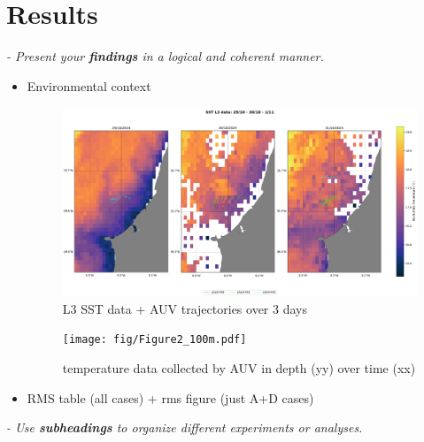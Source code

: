 \section{Results}
\textit{- Present your \textbf{findings} in a logical and coherent manner.}

\begin{itemize}
    \item Environmental context
    
\begin{figure}
    \centering
    \includegraphics[width=1\linewidth]{fig/SST_L3_color1.pdf}
    \caption{L3 SST data + AUV trajectories over 3 days}
    \label{fig:temperatureprofiles}
\end{figure}

\begin{figure}
    \centering
    \texttt{[image: fig/Figure2\_100m.pdf]}
    \caption{temperature data collected by AUV in depth (yy) over time (xx)}
    \label{fig:temperatureprofiles}
\end{figure}
    
    
    \item RMS table (all cases) + rms figure (just A+D cases)
\end{itemize}

 
\textit{- Use \textbf{subheadings} to organize different experiments or analyses.}
